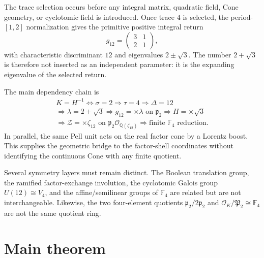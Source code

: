 \documentclass[11pt]{article}
\theoremstyle{definition}
\theoremstyle{remark}
\newcommand{\Q}{\mathbb Q}
\newcommand{\F}{\mathbb F}
\newcommand{\OO}{\mathcal O}
\begin{document}
The trace selection occurs before any integral matrix, quadratic field, Cone
geometry, or cyclotomic field is introduced.  Once trace $4$ is selected, the
period-$[1,2]$ normalization gives the primitive positive integral return
\[
g_{12}=\begin{pmatrix}3&1\\2&1\end{pmatrix},
\]
with characteristic discriminant $12$ and eigenvalues $2\pm\sqrt3$.  The
number $2+\sqrt3$ is therefore not inserted as an independent parameter: it
is the expanding eigenvalue of the selected return.

The main dependency chain is
\[
\boxed{
\begin{gathered}
K=H^{-1}
\Longleftrightarrow \sigma=2
\Longrightarrow \tau=4
\Longrightarrow \Delta=12\\
\Longrightarrow \lambda=2+\sqrt3
\Longrightarrow g_{12}=\times\lambda\text{ on }\mathfrak p_2
\Longrightarrow H=\times\sqrt3\\
\Longrightarrow \mathcal Z=\times\zeta_{12}
\text{ on }\mathfrak p_2\OO_{\Q(\zeta_{12})}
\Longrightarrow \text{finite }\F_4\text{ reduction}.
\end{gathered}}
\]
In parallel, the same Pell unit acts on the real factor cone by a Lorentz
boost.  This supplies the geometric bridge to the factor-shell coordinates
without identifying the continuous Cone with any finite quotient.

Several symmetry layers must remain distinct.  The Boolean translation group,
the ramified factor-exchange involution, the cyclotomic Galois group
$U(12)\cong V_4$, and the affine/semilinear groups of $\F_4$ are related but
are not interchangeable.  Likewise, the two four-element quotients
$\mathfrak p_2/2\mathfrak p_2$ and
$\OO_K/\mathfrak P_2\cong\F_4$ are not the same quotient ring.

\section{Main theorem}
\end{document}
